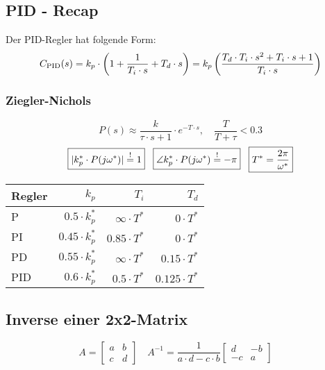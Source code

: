 \subsection{PID - Recap}
    Der PID-Regler hat folgende Form:
    \begin{equation*}
        C_{\textnormal{PID}}(s) = k_p\cdot\left(1 + \frac{1}{T_i\cdot s} + T_d\cdot s\right) = k_p\left(\frac{T_d\cdot T_i\cdot s^2 + T_i\cdot s + 1}{T_i\cdot s}\right)
    \end{equation*}
    
    \subsubsection{Ziegler-Nichols}
    \begin{equation*}
        P(s) \approx \frac{k}{\tau\cdot s + 1}\cdot e^{-T\cdot s}, \quad \frac{T}{T+\tau} < 0.3
    \end{equation*}
        \begin{equation*}
            \boxed{|k_p^* \cdot P(j\omega^*)| \overset{!}{=} 1} \hspace{3mm}
            \boxed{\angle k_p^* \cdot P(j\omega^*)\overset{!}{=}-\pi} \hspace{3mm}
            \boxed{T^* =\frac{2\pi}{\omega^*}}
        \end{equation*}
        \begin{center}
        {\renewcommand{\arraystretch}{1.2}
            \begin{tabular}{l r r r}
            Regler & $k_p$ & $T_i$ & $T_d$ \\
                 \hline
                P & $0.5\cdot k_p^*$ & $\infty \cdot T^*$ & $0 \cdot T^*$ \\
                PI & $0.45\cdot k_p^*$ & $0.85\cdot T^*$ & $0 \cdot T^*$\\
                PD & $0.55 \cdot k_p^* $& $\infty \cdot T^*$ &  $0.15\cdot T^*$\\
                PID & $0.6\cdot k_p^*$ & $0.5 \cdot T^*$ & $0.125 \cdot T^*$\\
            \end{tabular}}
        \end{center}

\subsection{Inverse einer 2x2-Matrix}
    \begin{equation*}
        A = \begin{bmatrix} a & b \\ c & d \end{bmatrix}\quad
        A^{-1} = \frac{1}{a\cdot d - c\cdot b}\begin{bmatrix} d & -b \\ -c & a \end{bmatrix}\quad
    \end{equation*}
    
